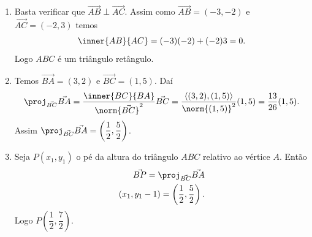 \begin{exemplos}
\begin{enumerate}
\begin{solucao}
\begin{figure}[!h]

       \end{figure}
       \begin{enumerate}
         \item Basta verificar que $\vec{AB}\perp\vec{AC}$. Assim como $\vec{AB} = (-3,-2)$ e $\vec{AC} = (-2,3)$ temos
         \[
            \inner{AB}{AC} = (-3)(-2) + (-2)3 = 0.
         \]
         Logo $ABC$ é um triângulo retângulo.
         \item Temos $\vec{BA} = (3,2)$ e $\vec{BC} = (1,5)$. Daí
         \[
            \proj_{\vec{BC}}\vec{BA} = \dfrac{\inner{BC}{BA}}{\norm{\vec{BC}}^2}\vec{BC} = \dfrac{\langle (3,2), (1,5)\rangle}{\norm{(1,5)}^2}(1,5) = \dfrac{13}{26}(1,5).
         \]
         Assim $\proj_{\vec{BC}}\vec{BA} = \left(\dfrac{1}{2},\dfrac{5}{2}\right)$.
         \item Seja $P(x_1, y_1)$ o pé da altura do triângulo $ABC$ relativo ao vértice $A$. Então
         \begin{align*}
           \vec{BP} = \proj_{\vec{BC}}\vec{BA}\\
           (x_1, y_1 - 1) = \left(\dfrac{1}{2}, \dfrac{5}{2}\right).
         \end{align*}
         Logo $P\left(\dfrac{1}{2},\dfrac{7}{2}\right)$.
       \end{enumerate}
     \end{solucao}
  \end{enumerate}
\end{exemplos}
